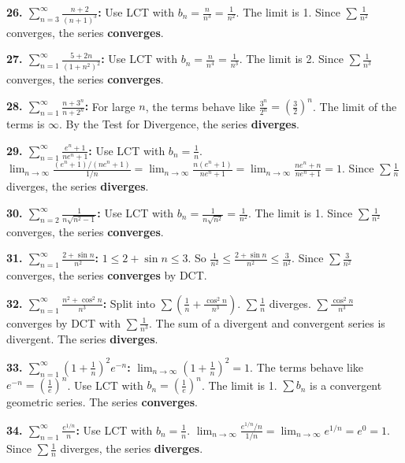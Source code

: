 \documentclass{article}
\begin{document}
\textbf{26. \(\sum_{n=3}^{\infty} \frac{n+2}{(n+1)^3}\):} Use LCT with \(b_n = \frac{n}{n^3} = \frac{1}{n^2}\). The limit is 1. Since \(\sum \frac{1}{n^2}\) converges, the series \textbf{converges}.

\textbf{27. \(\sum_{n=1}^{\infty} \frac{5+2n}{(1+n^2)^2}\):} Use LCT with \(b_n = \frac{n}{n^4} = \frac{1}{n^3}\). The limit is 2. Since \(\sum \frac{1}{n^3}\) converges, the series \textbf{converges}.

\textbf{28. \(\sum_{n=1}^{\infty} \frac{n+3^n}{n+2^n}\):} For large \(n\), the terms behave like \(\frac{3^n}{2^n} = (\frac{3}{2})^n\). The limit of the terms is \(\infty\). By the Test for Divergence, the series \textbf{diverges}.

\textbf{29. \(\sum_{n=1}^{\infty} \frac{e^n+1}{ne^n+1}\):} Use LCT with \(b_n = \frac{1}{n}\). \(\lim_{n \to \infty} \frac{(e^n+1)/(ne^n+1)}{1/n} = \lim_{n \to \infty} \frac{n(e^n+1)}{ne^n+1} = \lim_{n \to \infty} \frac{ne^n+n}{ne^n+1} = 1\). Since \(\sum \frac{1}{n}\) diverges, the series \textbf{diverges}.

\textbf{30. \(\sum_{n=2}^{\infty} \frac{1}{n\sqrt{n^2-1}}\):} Use LCT with \(b_n = \frac{1}{n\sqrt{n^2}} = \frac{1}{n^2}\). The limit is 1. Since \(\sum \frac{1}{n^2}\) converges, the series \textbf{converges}.

\textbf{31. \(\sum_{n=1}^{\infty} \frac{2+\sin n}{n^2}\):} \(1 \le 2+\sin n \le 3\). So \(\frac{1}{n^2} \le \frac{2+\sin n}{n^2} \le \frac{3}{n^2}\). Since \(\sum \frac{3}{n^2}\) converges, the series \textbf{converges} by DCT.

\textbf{32. \(\sum_{n=1}^{\infty} \frac{n^2+\cos^2 n}{n^3}\):} Split into \(\sum (\frac{1}{n} + \frac{\cos^2 n}{n^3})\). \(\sum \frac{1}{n}\) diverges. \(\sum \frac{\cos^2 n}{n^3}\) converges by DCT with \(\sum \frac{1}{n^3}\). The sum of a divergent and convergent series is divergent. The series \textbf{diverges}.

\textbf{33. \(\sum_{n=1}^{\infty} (1+\frac{1}{n})^2 e^{-n}\):} \(\lim_{n \to \infty} (1+\frac{1}{n})^2 = 1\). The terms behave like \(e^{-n} = (\frac{1}{e})^n\). Use LCT with \(b_n = (\frac{1}{e})^n\). The limit is 1. \(\sum b_n\) is a convergent geometric series. The series \textbf{converges}.

\textbf{34. \(\sum_{n=1}^{\infty} \frac{e^{1/n}}{n}\):} Use LCT with \(b_n = \frac{1}{n}\). \(\lim_{n \to \infty} \frac{e^{1/n}/n}{1/n} = \lim_{n \to \infty} e^{1/n} = e^0 = 1\). Since \(\sum \frac{1}{n}\) diverges, the series \textbf{diverges}.
\end{document}
